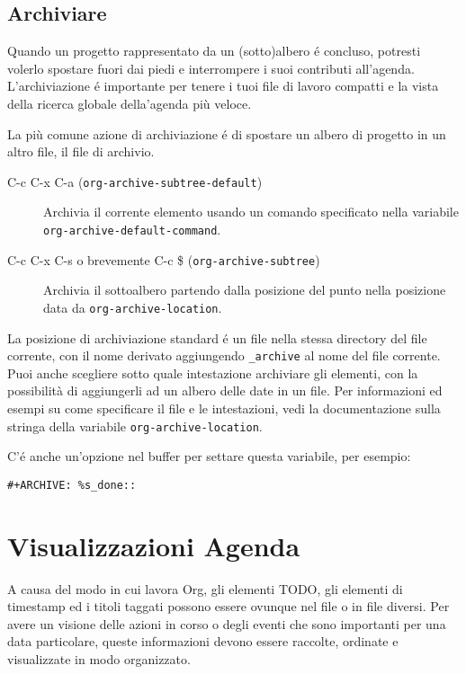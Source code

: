 \documentclass[11pt]{article}
\begin{document}
\subsection{Archiviare}
\label{sec:org892e25f}
Quando un progetto rappresentato da un (sotto)albero é concluso,
potresti volerlo spostare fuori dai piedi e interrompere i suoi
contributi all'agenda. L'archiviazione é importante per tenere i tuoi
file di lavoro compatti e la vista della ricerca globale della'agenda
più veloce.

La più comune azione di archiviazione é di spostare un albero di
progetto in un altro file, il file di archivio.

\begin{description}
\item[{C-c C-x C-a (\texttt{org-archive-subtree-default})}] Archivia il corrente elemento usando un comando specificato nella
variabile \texttt{org-archive-default-command}.

\item[{C-c C-x C-s o brevemente C-c \$ (\texttt{org-archive-subtree})}] Archivia il sottoalbero partendo dalla posizione del punto nella
posizione data da \texttt{org-archive-location}.
\end{description}

La posizione di archiviazione standard é un file nella stessa
directory del file corrente, con il nome derivato aggiungendo
\texttt{\_archive} al nome del file corrente. Puoi anche scegliere sotto quale
intestazione archiviare gli elementi, con la possibilità di
aggiungerli ad un albero delle date in un file. Per informazioni ed
esempi su come specificare il file e le intestazioni, vedi la documentazione
sulla stringa della variabile \texttt{org-archive-location}.

C'é anche un'opzione nel buffer per settare questa variabile, per
esempio:

\begin{verbatim}
#+ARCHIVE: %s_done::
\end{verbatim}

\section{Visualizzazioni Agenda}
\label{sec:org3ad7d0f}
A causa del modo in cui lavora Org, gli elementi TODO, gli elementi di
timestamp ed i titoli taggati possono essere ovunque nel file o in
file diversi. Per avere un visione delle azioni in corso o degli
eventi che sono importanti per una data particolare, queste
informazioni devono essere raccolte, ordinate e visualizzate in modo
organizzato.
\end{document}
